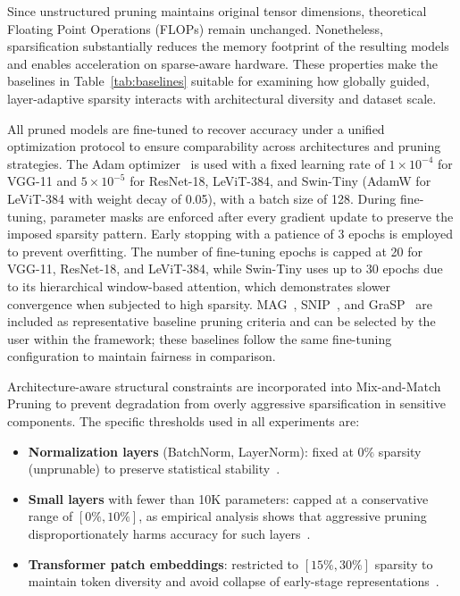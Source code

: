 \documentclass[11pt, conference]{IEEEtran}
\begin{document}
Since unstructured pruning maintains original tensor dimensions, theoretical Floating Point Operations (FLOPs) remain unchanged. Nonetheless, sparsification substantially reduces the memory footprint of the resulting models and enables acceleration on sparse-aware hardware. These properties make the baselines in Table~\ref{tab:baselines} suitable for examining how globally guided, layer-adaptive sparsity interacts with architectural diversity and dataset scale.


All pruned models are fine-tuned to recover accuracy under a unified optimization protocol to ensure comparability across architectures and pruning strategies. The Adam optimizer~\cite{kingma2014adam} is used with a fixed learning rate of $1 \times 10^{-4}$ for VGG-11 and $5 \times 10^{-5}$ for ResNet-18, LeViT-384, and Swin-Tiny (AdamW for LeViT-384 with weight decay of 0.05), with a batch size of 128. During fine-tuning, parameter masks are enforced after every gradient update to preserve the imposed sparsity pattern. Early stopping with a patience of 3 epochs is employed to prevent overfitting. The number of fine-tuning epochs is capped at 20 for VGG-11, ResNet-18, and LeViT-384, while Swin-Tiny uses up to 30 epochs due to its hierarchical window-based attention, which demonstrates slower convergence when subjected to high sparsity. MAG~\cite{han2015learning}, SNIP~\cite{lee2018snip}, and GraSP~\cite{wang2020picking} are included as representative baseline pruning criteria and can be selected by the user within the framework; these baselines follow the same fine-tuning configuration to maintain fairness in comparison.

Architecture-aware structural constraints are incorporated into Mix-and-Match Pruning to prevent degradation from overly aggressive sparsification in sensitive components. The specific thresholds used in all experiments are:

\begin{itemize}
    \item \textbf{Normalization layers} (BatchNorm, LayerNorm): fixed at $0\%$ sparsity (unprunable) to preserve statistical stability~\cite{li2017pruning}.
    \item \textbf{Small layers} with fewer than 10K parameters: capped at a conservative range of $[0\%, 10\%]$, as empirical analysis shows that aggressive pruning disproportionately harms accuracy for such layers~\cite{han2015learning}.
    \item \textbf{Transformer patch embeddings}: restricted to $[15\%, 30\%]$ sparsity to maintain token diversity and avoid collapse of early-stage representations~\cite{dosovitskiy2021vit}.
\end{itemize}
\end{document}
